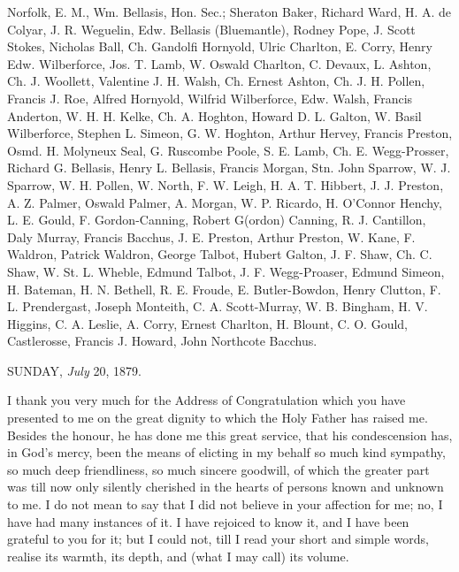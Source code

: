 Norfolk, E. M., Wm. Bellasis, Hon. Sec.; Sheraton Baker, Richard
Ward, H. A. de Colyar, J. R. Weguelin, Edw. Bellasis (Bluemantle),
Rodney Pope, J. Scott Stokes, Nicholas Ball, Ch. Gandolfi Hornyold,
Ulric Charlton, E. Corry, Henry Edw. Wilberforce, Jos. T. Lamb, W.
Oswald Charlton, C. Devaux, L. Ashton, Ch. J. Woollett, Valentine J.
H. Walsh, Ch. Ernest Ashton, Ch. J. H. Pollen, Francis J. Roe, Alfred
Hornyold, Wilfrid Wilberforce, Edw. Walsh, Francis Anderton, W. H. H.
Kelke, Ch. A. Hoghton, Howard D. L. Galton, W. Basil Wilberforce,
Stephen L. Simeon, G. W. Hoghton, Arthur Hervey, Francis Preston, Osmd.
H. Molyneux Seal, G. Ruscombe Poole, S. E. Lamb, Ch. E. Wegg-Prosser,
Richard G. Bellasis, Henry L. Bellasis, Francis Morgan, Stn. John
Sparrow, W. J. Sparrow, W. H. Pollen, W. North, F. W. Leigh, H. A. T.
Hibbert, J. J. Preston, A. Z. Palmer, Oswald Palmer, A. Morgan, W. P.
Ricardo, H. O'Connor Henchy, L. E. Gould, F. Gordon-Canning, Robert
G(ordon) Canning, R. J. Cantillon, Daly Murray, Francis Bacchus, J. E.
Preston, Arthur Preston, W. Kane, F. Waldron, Patrick Waldron, George
Talbot, Hubert Galton, J. F. Shaw, Ch. C. Shaw, W. St. L. Wheble,
Edmund Talbot, J. F. Wegg-Proaser, Edmund Simeon, H. Bateman, H. N.
Bethell, R. E. Froude, E. Butler-Bowdon, Henry Clutton, F. L.
Prendergast, Joseph Monteith, C. A. Scott-Murray, W. B. Bingham, H. V.
Higgins, C. A. Leslie, A. Corry, Ernest Charlton, H. Blount, C. O.
Gould, Castlerosse, Francis J. Howard, John Northcote Bacchus.


SUNDAY, \emph{July} 20, 1879.

I thank you very much for the Address of Congratulation which you have
presented to me on the great dignity to which the Holy Father has
raised me. Besides the honour, he has done me this great service, that
his condescension has, in God's mercy, been the means of elicting
in my behalf so much kind sympathy, so much deep friendliness,
so much sincere goodwill, of which the greater part was till now only
silently cherished in the hearts of persons known and unknown to me. I
do not mean to say that I did not believe in your affection for me;
no, I have had many instances of it. I have rejoiced to know it, and I
have been grateful to you for it; but I could not, till I read your
short and simple words, realise its warmth, its depth, and (what I may
call) its volume.


